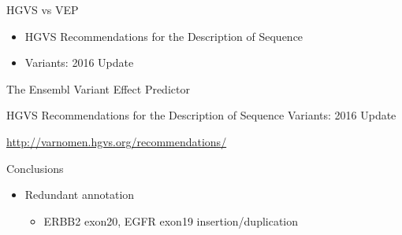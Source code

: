 \documentclass[
  ignorenonframetext,
]{beamer}
\providecommand{\tightlist}{%
  \setlength{\itemsep}{0pt}\setlength{\parskip}{0pt}}
\begin{document}
\begin{frame}{HGVS vs VEP}
\protect\hypertarget{hgvs-vs-vep}{}

\begin{itemize}
\tightlist
\item
  HGVS Recommendations for the Description of Sequence\\
\item
  Variants: 2016 Update
\end{itemize}

\begin{block}{The Ensembl Variant Effect Predictor}

\end{block}

\end{frame}

\begin{frame}{HGVS Recommendations for the Description of Sequence
Variants: 2016 Update}
\protect\hypertarget{hgvs-recommendations-for-the-description-of-sequence-variants-2016-update}{}

\begin{block}{\url{http://varnomen.hgvs.org/recommendations/}}

\end{block}

\end{frame}

\begin{frame}{Conclusions}
\protect\hypertarget{conclusions}{}

\begin{itemize}
\tightlist
\item
  Redundant annotation

  \begin{itemize}
  \tightlist
  \item
    ERBB2 exon20, EGFR exon19 insertion/duplication
  \end{itemize}
\end{itemize}

\end{frame}
\end{document}
